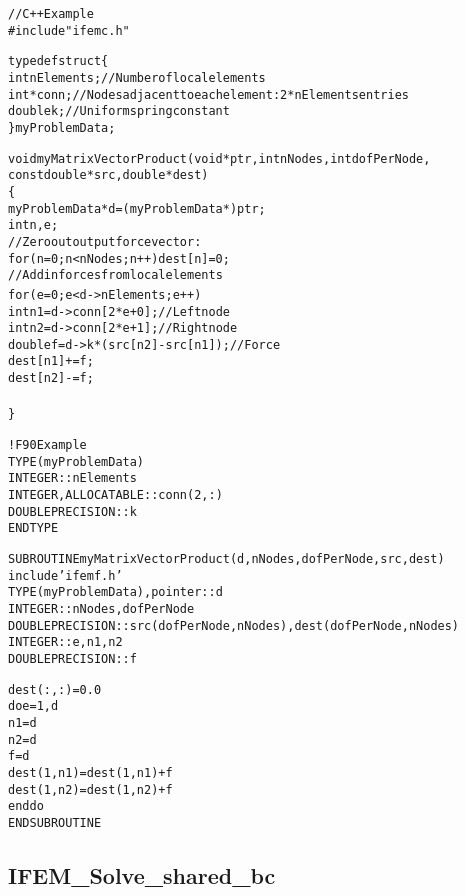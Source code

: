 \documentclass[10pt]{article}
\begin{document}
\begin{alltt}
// C++ Example
#include "ifemc.h"

typedef struct \{
  int nElements; //Number of local elements
  int *conn; // Nodes adjacent to each element: 2*nElements entries
  double k; //Uniform spring constant
\} myProblemData;

void myMatrixVectorProduct(void *ptr,int nNodes,int dofPerNode,
          const double *src,double *dest) 
\{
  myProblemData *d=(myProblemData *)ptr;
  int n,e;
  // Zero out output force vector:
  for (n=0;n<nNodes;n++) dest[n]=0;
  // Add in forces from local elements
  for (e=0;e<d->nElements;e++) {
    int n1=d->conn[2*e+0]; // Left node
    int n2=d->conn[2*e+1]; // Right node
    double f=d->k * (src[n2]-src[n1]); //Force
    dest[n1]+=f;
    dest[n2]-=f;
  }
\}


! F90 Example
  TYPE(myProblemData) 
    INTEGER :: nElements
    INTEGER, ALLOCATABLE :: conn(2,:)
    DOUBLE PRECISION :: k
  END TYPE
  
SUBROUTINE myMatrixVectorProduct(d,nNodes,dofPerNode,src,dest)
  include 'ifemf.h'
  TYPE(myProblemData), pointer :: d
  INTEGER :: nNodes,dofPerNode
  DOUBLE PRECISION :: src(dofPerNode,nNodes), dest(dofPerNode,nNodes)
  INTEGER :: e,n1,n2
  DOUBLE PRECISION :: f
  
  dest(:,:)=0.0
  do e=1,d%nElements
    n1=d%conn(1,e)
    n2=d%conn(2,e)
    f=d%k * (src(1,n2)-src(1,n1))
    dest(1,n1)=dest(1,n1)+f
    dest(1,n2)=dest(1,n2)+f
  end do
END SUBROUTINE
\end{alltt}


\newpage
\subsection{IFEM\_Solve\_shared\_bc}

\end{document}

